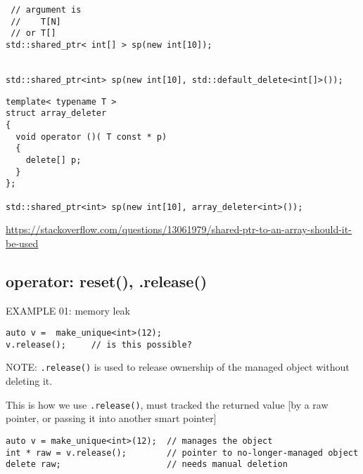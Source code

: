 \begin{lstlisting}
 // argument is 
 //    T[N]
 // or T[]
std::shared_ptr< int[] > sp(new int[10]);


std::shared_ptr<int> sp(new int[10], std::default_delete<int[]>());
\end{lstlisting}

\begin{lstlisting}
template< typename T >
struct array_deleter
{
  void operator ()( T const * p)
  { 
    delete[] p; 
  }
};

std::shared_ptr<int> sp(new int[10], array_deleter<int>());
\end{lstlisting}


\url{https://stackoverflow.com/questions/13061979/shared-ptr-to-an-array-should-it-be-used}




\subsection{operator: reset(), .release()}	
\label{sec:reset()_smart_pointer}
\label{sec:release()_smart_pointer}

EXAMPLE 01: memory leak
\begin{verbatim}
auto v =  make_unique<int>(12);
v.release();     // is this possible?
\end{verbatim}
NOTE: \verb!.release()! is used to release ownership of the managed object without deleting it. 

This is how we use \verb!.release()!, must tracked the returned value [by a raw pointer, or passing it into another smart pointer]

\begin{lstlisting}
auto v = make_unique<int>(12);  // manages the object
int * raw = v.release();        // pointer to no-longer-managed object
delete raw;                     // needs manual deletion
\end{lstlisting}

